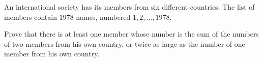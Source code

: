 An international society has its members from six different countries.  The list of members contain $1978$ names, numbered $1, 2, \dots, 1978$.

  Prove that there is at least one member whose number is the sum of the
 numbers of two members from his own country, or twice as large as the 
number of one member from his own country.

